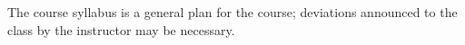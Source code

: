 The course syllabus is a general plan for the course; deviations announced to the class by the instructor may be necessary.
